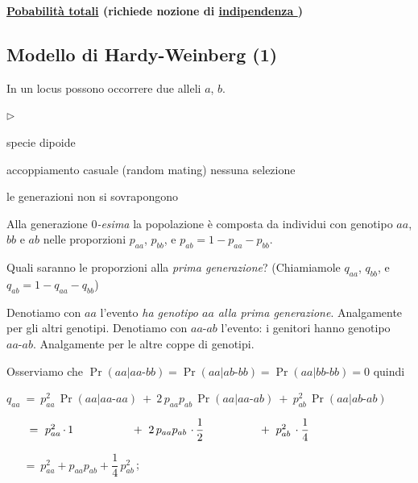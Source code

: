 \documentclass[11pt,openany]{book}
\newcommand{\mylabel}[1]{{\footnotesize\textsf{#1}}\hfill}
\newenvironment{citemize}
  {\begin{list}{$\triangleright$}{%
   \setlength{\parskip}{0mm}
   \setlength{\topsep}{.2\baselineskip}
   \setlength{\rightmargin}{0mm}
   \setlength{\listparindent}{0mm}
   \setlength{\itemindent}{0mm}
   \setlength{\labelwidth}{3ex}
   \setlength{\itemsep}{.1\baselineskip}
   \setlength{\parsep}{0mm}
   \setlength{\partopsep}{0mm}
   \setlength{\labelsep}{1ex}
   \setlength{\leftmargin}{\labelwidth+\labelsep}
   \let\makelabel\mylabel}}{%
   \end{list}\vspace*{-1.3mm}}
\begin{document}
\hfill{}\clearpage
\hfill\textbf{{\color{brown}\hyperref[TeoremaProbabilitaTotali]{Pobabilità totali} \faShare} (richiede nozione di \hyperref[indipendenza]{indipendenza \faShare})}

\subsection{Modello di Hardy-Weinberg (1)}
\label{HW_totali1}

In un locus possono occorrere due alleli $a$, $b$. 

\begin{citemize}
\item specie dipoide
\item accoppiamento casuale (random mating) nessuna selezione
\item le generazioni non si sovrapongono
\end{citemize}


Alla generazione \textit{$0$-esima\/} la popolazione è composta da individui con genotipo $aa$, $bb$ e $ab$ nelle proporzioni $p_{aa}$, $p_{bb}$, e  $p_{ab}=1-p_{aa}-p_{bb}$.

Quali saranno le proporzioni alla \textit{prima generazione}? (Chiamiamole $q_{aa}$, $q_{bb}$, e $q_{ab}=1-q_{aa}-q_{bb}$)

\def\-{\mbox{-}}

Denotiamo con $aa$ l'evento \textit{ha genotipo $aa$ alla prima generazione}. Analgamente per gli altri genotipi. Denotiamo con $aa\-ab$ l'evento: i genitori hanno genotipo $aa\mbox{-}ab$. Analgamente per le altre coppe di genotipi.

Osserviamo che $\Pr(aa | aa\-bb)=\Pr(aa | ab\-bb)=\Pr(aa | bb\-bb)=0$ quindi

$q_{aa}\ =\ %
p_{aa}^2\, \Pr(aa | aa\-aa)\ +\ 
2\,p_{aa}p_{ab}\, \Pr(aa | aa\-ab)\ +\ 
p^2_{ab}\, \Pr(aa | ab\-ab)$


$\phantom{q_{aa}}\ =\ %
p_{aa}^2\,\rlap{$\cdot\,1$}\phantom{\Pr(aa | aa,aa)}\ +\ 
2\,p_{aa}p_{ab}\, \rlap{$\,\cdot\,\dfrac12$}\ \phantom{\Pr(aa | aa\-ab)}\ +\ 
p^2_{ab}\, \cdot\dfrac14$ 

$\phantom{q_{aa}}\ =\ p_{aa}^2+p_{aa}p_{ab} +\dfrac{1}{4}\,p^2_{ab}\,$;

% 
% 
% 
\end{document}

